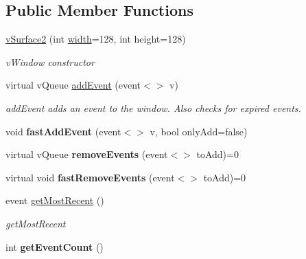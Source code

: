 \subsection*{Public Member Functions}
\begin{DoxyCompactItemize}
\item 
\hyperlink{classev_1_1vSurface2_ada6aeb852479aa111b1f5ad32ac1286b}{v\+Surface2} (int \hyperlink{classev_1_1vSurface2_a1aa8027816352a15d5b9bf1f26f48e76}{width}=128, int height=128)
\begin{DoxyCompactList}\small\item\em v\+Window constructor \end{DoxyCompactList}\item 
virtual v\+Queue \hyperlink{classev_1_1vSurface2_a6dee662976048b73d7b19e45871352da}{add\+Event} (event$<$$>$ v)
\begin{DoxyCompactList}\small\item\em add\+Event adds an event to the window. Also checks for expired events. \end{DoxyCompactList}\item 
\mbox{\label{classev_1_1vSurface2_a311f0fb7297ee4a070755308e9271398}} 
void {\bfseries fast\+Add\+Event} (event$<$$>$ v, bool only\+Add=false)
\item 
\mbox{\label{classev_1_1vSurface2_af35870c14a5c94dc7522bdfcf76df2cb}} 
virtual v\+Queue {\bfseries remove\+Events} (event$<$$>$ to\+Add)=0
\item 
\mbox{\label{classev_1_1vSurface2_a956e6ab8f419554958961fbbca68029b}} 
virtual void {\bfseries fast\+Remove\+Events} (event$<$$>$ to\+Add)=0
\item 
event \hyperlink{classev_1_1vSurface2_af84a860e057aea43831e8e6d16107cd4}{get\+Most\+Recent} ()
\begin{DoxyCompactList}\small\item\em get\+Most\+Recent \end{DoxyCompactList}\item 
\mbox{\label{classev_1_1vSurface2_a67906f1ecd7fab30f1d0f7218388234e}} 
int {\bfseries get\+Event\+Count} ()
\item 
\mbox{\label{classev_1_1vSurface2_a7897c4e7c034f36f86d29e14e36c2ca4}} 

\end{DoxyCompactItemize}
